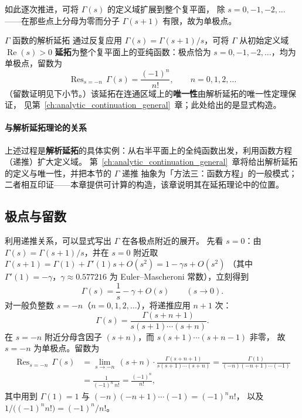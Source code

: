 如此逐次推进，可将 $\Gamma(s)$ 的定义域扩展到整个复平面，
除 $s = 0, -1, -2, \dots$——在那些点上分母为零而分子 $\Gamma(s+1)$ 有限，故为单极点。

\begin{theorem}{$\Gamma$ 函数的解析延拓}{}\label{thm:gamma-meromorphic}
通过反复应用 $\Gamma(s) = \Gamma(s+1)/s$，可将 $\Gamma$ 从初始定义域 $\operatorname{Re}(s) > 0$
\textbf{延拓}为整个复平面上的亚纯函数：极点恰为 $s = 0, -1, -2, \dots$，均为单极点，留数为
\[
\operatorname{Res}_{s=-n}\, \Gamma(s) = \frac{(-1)^n}{n!}, \qquad n = 0, 1, 2, \dots
\]
（留数证明见下小节。）该延拓在连通区域上的\textbf{唯一性}由解析延拓的唯一性定理保证，
见第~\ref{ch:analytic_continuation_general}~章；此处给出的是显式构造。
\end{theorem}


\paragraph{与解析延拓理论的关系}
上述过程是\textbf{解析延拓}的具体实例：从右半平面上的全纯函数出发，利用函数方程（递推）扩大定义域。
第~\ref{ch:analytic_continuation_general}~章将给出解析延拓的定义与唯一性，并把本节的 $\Gamma$ 递推
抽象为「方法三：函数方程」的一般模式；二者相互印证——本章提供可计算的构造，该章说明其在延拓理论中的位置。


\subsection{极点与留数}

利用递推关系，可以显式写出 $\Gamma$ 在各极点附近的展开。
先看 $s=0$：由 $\Gamma(s)=\Gamma(s+1)/s$，并在 $s=0$ 附近取
$\Gamma(s+1)=\Gamma(1)+\Gamma'(1)s+O(s^2)=1-\gamma s+O(s^2)$
（其中 $\Gamma'(1)=-\gamma$，$\gamma\approx 0.577216$ 为 Euler--Mascheroni 常数），立刻得到\label{prop:gamma-near-zero}
\[
\Gamma(s) = \frac{1}{s} - \gamma + O(s)
\qquad(s\to 0).
\]
对一般负整数 $s=-n$（$n=0,1,2,\dots$），将递推应用 $n+1$ 次：
\[
\Gamma(s) = \frac{\Gamma(s+n+1)}{s(s+1)\cdots(s+n)}.
\]
在 $s=-n$ 附近分母含因子 $(s+n)$，而 $s(s+1)\cdots(s+n-1)$ 非零，
故 $s=-n$ 为单极点。留数为\label{prop:gamma-residues}
\begin{align*}
\operatorname{Res}_{s=-n}\,\Gamma(s)
&= \lim_{s \to -n}\,(s+n)\cdot\frac{\Gamma(s+n+1)}{s(s+1)\cdots(s+n)}
= \frac{\Gamma(1)}{(-n)(-n+1)\cdots(-1)} \\
&= \frac{1}{(-1)^n\,n!}
= \frac{(-1)^n}{n!},
\end{align*}
其中用到 $\Gamma(1)=1$ 与 $(-n)(-n+1)\cdots(-1)=(-1)^n n!$，
以及 $1\big/\!\bigl((-1)^n n!\bigr)=(-1)^n/n!$。

